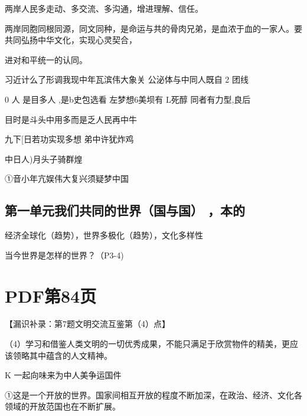 \documentclass[lang=cn,11pt]{elegantbook}
\newcommand{\daofasym}[1]{{\daofasymbolfont #1}}
\newcommand{\daofasym}[1]{#1}
\begin{document}
两岸人民多走动、多交流、多沟通，增进理解、信任。\par

两岸同胞同根同源，同文同种，是命运与共的骨肉兄弟，是血浓于血的一家人。要共同弘扬中华文化，实现心灵契合，\par

进对和平统一的认同。\par

习近计么了形调我现中年瓦滨伟大象关 公泌体与中同人既自 2 团线\par

0 人 是目多人 ,是b史包选看 左梦想6美坝有 L死醇 同者有力型,良后\par

目时是斗头中用多而是乏人民再中牛\par

九下[日若功实现多想 弟中许犹炸鸡\par

中日人)月头子骑群煌\par

\daofasym{①}音小年亢娱伟大复兴须疑梦中国\par

\subsection*{第一单元我们共同的世界（国与国） ，本的}

经济全球化（趋势），世界多极化（趋势），文化多样性\par

当今世界是怎样的世界？（P3-4)\par


\section*{PDF第84页}

【漏识补录：第7题文明交流互鉴第（4）点】\par

（4）学习和借鉴人类文明的一切优秀成果，不能只满足于欣赏物件的精美，更应该领略其中蕴含的人文精神。\par

K 一起向味来为中人美争运国件\par

\daofasym{①}这是一个开放的世界。国家间相互开放的程度不断加深，在政治、经济、文化各领域的开放范国也在不断扩展。\par
\end{document}
